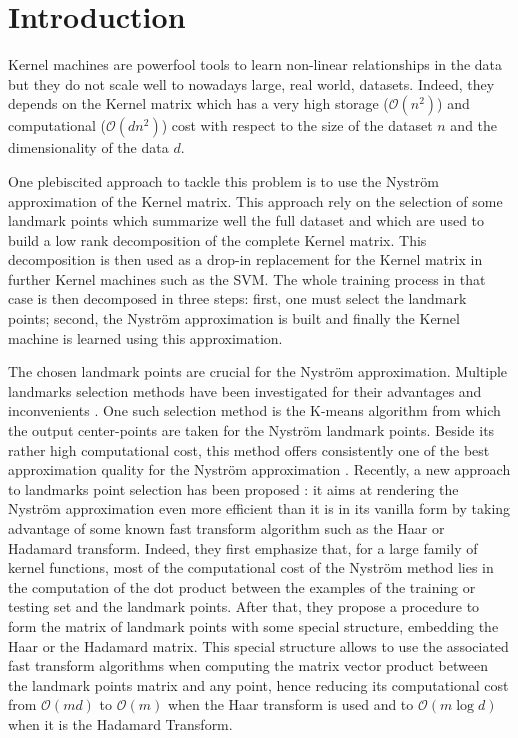 \section{Introduction}

Kernel machines are powerfool tools to learn non-linear relationships in the data but they do not scale well to nowadays large, real world, datasets. Indeed, they depends on the Kernel matrix which has a very high storage ($\mathcal{O}(n^2)$) and computational ($\mathcal{O}(dn^2)$) cost with respect to the size of the dataset $n$ and the dimensionality of the data $d$.

One plebiscited approach to tackle this problem is to use the Nyström approximation of the Kernel matrix. This approach rely on the selection of some landmark points which summarize well the full dataset and which are used to build a low rank decomposition of the complete Kernel matrix. This decomposition is then used as a drop-in replacement for the Kernel matrix in further Kernel machines such as the SVM. The whole training process in that case is then decomposed in three steps: first, one must select the landmark points; second, the Nyström approximation is built and finally the Kernel machine is learned using this approximation. 

The chosen landmark points are crucial for the Nyström approximation. Multiple landmarks selection methods have been investigated for their advantages and inconvenients \cite{kumar2012sampling}. One such selection method is the K-means algorithm \cite{kmeanspaper?} from which the output center-points are taken for the Nyström landmark points. Beside its rather high computational cost, this method offers consistently one of the best approximation quality for the Nyström approximation \cite{kmeansnystrom?}. Recently, a new approach to landmarks point selection has been proposed \cite{si2016computationally}: it aims at rendering the Nyström approximation even more efficient than it is in its vanilla form by taking advantage of some known fast transform algorithm such as the Haar or Hadamard transform. Indeed, they first emphasize that, for a large family of kernel functions, most of the computational cost of the Nyström method lies in the computation of the dot product between the examples of the training or testing set and the landmark points. After that, they propose a procedure to form the matrix of landmark points with some special structure, embedding the Haar or the Hadamard matrix. This special structure allows to use the associated fast transform algorithms when computing the matrix vector product between the landmark points matrix and any point, hence reducing its computational cost from $\mathcal{O}(md)$ to $\mathcal{O}(m)$ when the Haar transform is used and to $\mathcal{O}(m \log d)$ when it is the Hadamard Transform.

